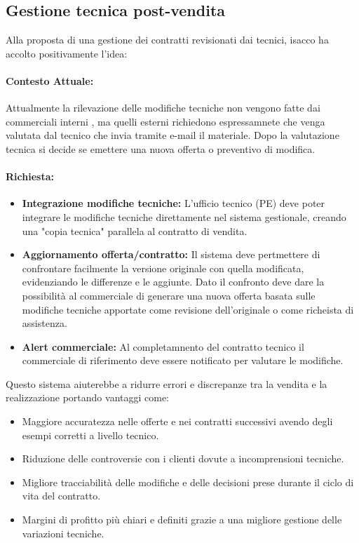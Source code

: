 \documentclass[12pt, a4paper]{article} %
\begin{document}
\subsection{Gestione tecnica post-vendita}
Alla proposta di una gestione dei contratti revisionati dai tecnici, isacco ha
accolto positivamente l'idea:
\paragraph{Contesto Attuale:}
Attualmente la rilevazione delle modifiche tecniche non vengono fatte dai
commerciali interni , ma quelli esterni richiedono espressamnete che venga
valutata dal tecnico che invia tramite e-mail il materiale. Dopo la valutazione
tecnica si decide se emettere una nuova offerta o preventivo di modifica.
\paragraph{Richiesta:}
\begin{itemize}
      \item \textbf{Integrazione modifiche tecniche:} L'ufficio tecnico (PE) deve poter integrare le modifiche tecniche direttamente nel sistema gestionale,
            creando una "copia tecnica" parallela al contratto di vendita.
      \item \textbf{Aggiornamento offerta/contratto:} Il sistema deve pertmettere di confrontare facilmente la versione originale con quella modificata,
            evidenziando le differenze e le aggiunte. Dato il confronto deve dare la possibilità al commerciale di generare una nuova offerta basata sulle
            modifiche tecniche apportate come revisione dell'originale o come richeista di assistenza.
      \item \textbf{Alert commerciale:} Al completamnento del contratto tecnico il commerciale di riferimento deve essere notificato per valutare le modifiche.
\end{itemize}
Questo sistema aiuterebbe a ridurre errori e discrepanze tra la vendita e la realizzazione portando vantaggi come:
\begin{itemize}
      \item Maggiore accuratezza nelle offerte e nei contratti successivi avendo degli
            esempi corretti a livello tecnico.
      \item Riduzione delle controversie con i clienti dovute a incomprensioni tecniche.
      \item Migliore tracciabilità delle modifiche e delle decisioni prese durante il ciclo
            di vita del contratto.
      \item Margini di profitto più chiari e definiti grazie a una migliore gestione delle
            variazioni tecniche.
\end{itemize}
\end{document}

